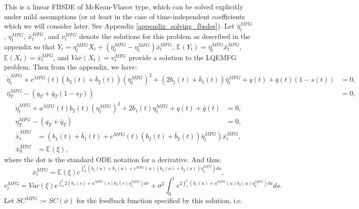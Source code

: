 \documentclass[11pt]{article}
\begin{document}
This is a linear FBSDE of McKean-Vlasov type, which can be solved explicitly under mild assumptions (or at least in the case of time-independent coefficients which we will consider later. See Appendix \ref{appendix_solving_fbsdes}). Let $\bar{\eta}_t^{MFG}$, $\eta_t^{MFG}$, $\bar{x}_t^{MFG}$, and $v^{MFG}_t$ denote the solutions for this problem as described in the appendix so that $Y_t=\eta_t^{MFG}X_t+(\bar{\eta}_t^{MFG}-\eta_t^{MFG})\bar{x}_t^{MFG}$, $\mathbb{E}(Y_t)=\bar{\eta}_t^{MFG}\bar{x}_t^{MFG}$, $\mathbb{E}(X_t)=\bar{x}_t^{MFG}$, and $Var(X_t)=v^{MFG}_t$ provide a solution to the LQEMFG problem. Then from the appendix, we have:
\begin{equation}
\begin{split}
\dot{\bar{\eta}}^{MFG}_t+c^{MFG}(t)(b_2(t)+\bar{b}_2(t)) (\bar{\eta}^{MFG}_t)^2+(2b_1(t)+\bar{b}_1(t)) \bar{\eta}^{MFG}_t +q(t)+\bar{q}(t)(1-s(t))&=0,\\
\bar{\eta}^{MFG}_T-(q_T+\bar{q}_T(1-s_T))&=0,
\end{split}
\label{eq:eta_bar_MFG}
\end{equation}
\begin{equation}
\begin{split}
\dot{\eta}^{MFG}_t+a^{MFG}(t)b_2(t)(\eta^{MFG}_t)^2+2b_1(t)\eta^{MFG}_t+q(t)+\bar{q}(t)&=0, \\
\eta^{MFG}_T-(q_T+\bar{q}_T)&=0,
\end{split}
\end{equation}
\begin{equation}
\begin{split}
\dot{\bar{x}}^{MFG}_t&=(b_1(t)+\bar{b}_1(t)+c^{MFG}(t)(b_2(t)+\bar{b}_2(t))\bar{\eta}^{MFG}_t)\bar{x}^{MFG}_t, \\
\bar{x}^{MFG}_0&=\mathbb{E}(\xi),
\end{split}
\label{eq:x_bar_MFG}
\end{equation}
where the dot is the standard ODE notation for a derivative. And thus,
\begin{equation}
\bar{x}^{MFG}_t=\mathbb{E}(\xi) e^{\int_0^t(b_1(u)+\bar{b}_1(u)+c^{MFG}(u)(b_2(u)+\bar{b}_2(u))\bar{\eta}^{MFG}_u)du},
\label{eq:x_bar_MFG_explicit}
\end{equation}
\begin{equation}
v^{MFG}_t=Var(\xi)e^{\int_0^t 2(b_1(s)+a^{MFG}(s)b_2(s)\eta^{MFG}_s)ds}+\sigma^2 \int_0^t e^{2 \int_s^t (b_1(u)+a^{MFG}(u)b_2(u)\eta^{MFG}_u) du}ds.
\label{eq:v_t}
\end{equation}
Let $SC^{MFG}:=SC(\phi)$ for the feedback function specified by this solution, i.e.
\end{document}
